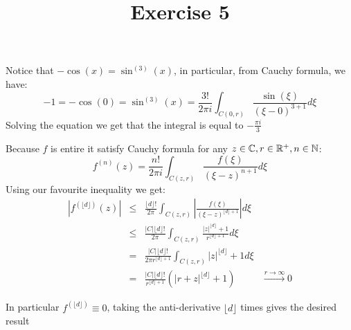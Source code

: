 

\usepackage{skak}
\usepackage{relsize}
\usepackage{graphicx}
\usepackage{mathtools}

\usepackage{textcomp}
\usepackage{bbding}

\usepackage{soul}

\newcommand{\flower}{\text{\scalebox{0.75}{\raisebox{-0.7ex}{
				\rotatebox{90}{\textleaf}\hspace{-0.3em}
				\scalebox{0.7}{\textleaf}\hspace{-1.35em}
				\raisebox{1ex}{\scalebox{0.8}{\FiveFlowerOpen}}
}}}}
\newcommand{\ei}[1]{e^{i#1}}


\title{Exercise 5}

\maketitle
\begin{cExercise}[][][author]
	Notice that $-\cos(x)=\sin^{(3)}(x)$, in particular, from Cauchy formula, we have:
	\begin{equation*}
		-1=-\cos(0)=\sin^{(3)}(x)=\frac{3!}{2\pi i}\int_{C(0,r)}\frac{\sin(\xi)}{(\xi-0)^{3+1}}d\xi
	\end{equation*}
	Solving the equation we get that the integral is equal to $-\frac{\pi i}3$
\end{cExercise}
\begin{cExercise}
	Because $f$ is entire it satisfy Cauchy formula for any $z\in\mathbb C, r\in\mathbb R^+,n\in\mathbb N$:
	\begin{equation*}
		f^{(n)}(z)=\frac{n!}{2\pi i}\int_{C(z,r)}\frac{f(\xi)}{(\xi-z)^{n+1}}d\xi
	\end{equation*}
	Using our favourite inequality we get:
	\begin{align*}
		&|f^{(\lfloor d\rfloor)}(z)|&\le& \frac{\lfloor d\rfloor!}{2\pi }\int_{C(z,r)}\left|\frac{f(\xi)}{(\xi-z)^{\lfloor d\rfloor+1}}\right|d\xi&\\
		&&\le& \frac{|C|\lfloor d\rfloor!}{2\pi }\int_{C(z,r)}\frac{\left|z\right|^{\lfloor d\rfloor}+1}{r^{\lfloor d\rfloor+1}}d\xi&\\
		&&=&\frac{|C|\lfloor d\rfloor!}{2\pi r^{\lfloor d\rfloor+1}}\int_{C(z,r)}\left|z\right|^{\lfloor d\rfloor}+1d\xi&\\
		&&=&\frac{|C|\lfloor d\rfloor!}{ r^{\lfloor d\rfloor+1}}(\left|r+z\right|^{\lfloor d\rfloor}+1)&\overset{r\to\infty}{\longrightarrow}0&
	\end{align*}

	In particular $f^{(\lfloor d\rfloor)}\equiv 0$, taking the anti-derivative $\lfloor d\rfloor$ times gives the desired result
\end{cExercise}
